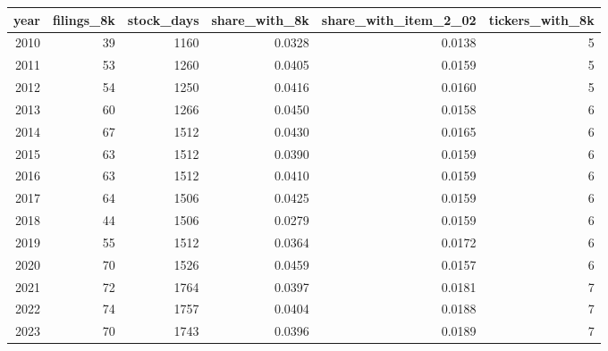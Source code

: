 \begin{tabular}{rrrrrr}
\toprule
year & filings\_8k & stock\_days & share\_with\_8k & share\_with\_item\_2\_02 & tickers\_with\_8k \\
\midrule
2010 & 39 & 1160 & 0.0328 & 0.0138 & 5 \\
2011 & 53 & 1260 & 0.0405 & 0.0159 & 5 \\
2012 & 54 & 1250 & 0.0416 & 0.0160 & 5 \\
2013 & 60 & 1266 & 0.0450 & 0.0158 & 6 \\
2014 & 67 & 1512 & 0.0430 & 0.0165 & 6 \\
2015 & 63 & 1512 & 0.0390 & 0.0159 & 6 \\
2016 & 63 & 1512 & 0.0410 & 0.0159 & 6 \\
2017 & 64 & 1506 & 0.0425 & 0.0159 & 6 \\
2018 & 44 & 1506 & 0.0279 & 0.0159 & 6 \\
2019 & 55 & 1512 & 0.0364 & 0.0172 & 6 \\
2020 & 70 & 1526 & 0.0459 & 0.0157 & 6 \\
2021 & 72 & 1764 & 0.0397 & 0.0181 & 7 \\
2022 & 74 & 1757 & 0.0404 & 0.0188 & 7 \\
2023 & 70 & 1743 & 0.0396 & 0.0189 & 7 \\
\bottomrule
\end{tabular}
